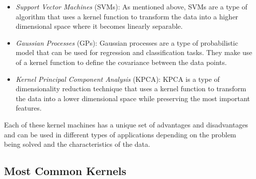 \documentclass[hidelinks]{book}
\begin{document}
\begin{itemize}
	 \item \textit{Support Vector Machines} (SVMs): As mentioned above, SVMs are a type of algorithm that uses a kernel function to transform the data into a higher dimensional space where it becomes linearly separable.

	 \item \textit{Gaussian Processes} (GPs): Gaussian processes are a type of probabilistic model that can be used for regression and classification tasks. They make use of a kernel function to define the covariance between the data points.

	 \item \textit{Kernel Principal Component Analysis} (KPCA): KPCA is a type of dimensionality reduction technique that uses a kernel function to transform the data into a lower dimensional space while preserving the most important features.
\end{itemize}

Each of these kernel machines has a unique set of advantages and disadvantages and can be used in different types of applications depending on the problem being solved and the characteristics of the data.

\subsection{Most Common Kernels}
\end{document}
